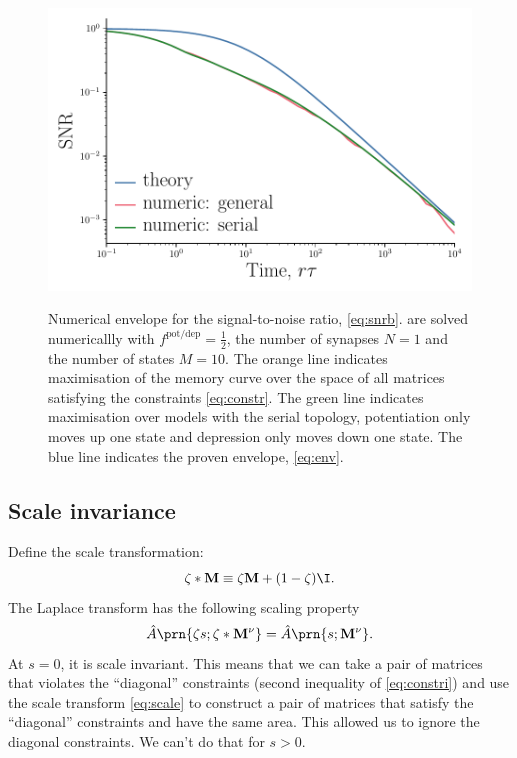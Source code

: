 \documentclass[12pt]{article}
\newcommand{\M}{\mathbf{M}}
\newcommand{\potdep}{^{\text{pot/dep}}}
\begin{document}
\begin{figure}[tb]
  \centering
  \includegraphics[width=0.8\linewidth]{LenvNum.pdf}\\
  \caption[Numerical envelope for the signal-to-noise ratio]
  {Numerical envelope for the signal-to-noise ratio, \eqref{eq:snrb}. 
   are solved numericallly with $f\potdep=\frac{1}{2}$, the number of synapses $N=1$ and the number of states $M=10$.
  The orange line indicates maximisation of the memory curve over the space of all matrices satisfying the constraints \eqref{eq:constr}.
  The green line indicates maximisation over models with the serial topology, \ie potentiation only moves up one state and depression only moves down one state.
  The blue line indicates the proven envelope, \eqref{eq:env}.}\label{fig:envnum}
\end{figure}



\subsection{Scale invariance}\label{sec:scale}

Define the scale transformation:
%
\begin{equation}\label{eq:scale}
  \zeta * \M \equiv \zeta \M + (1-\zeta)\I .
\end{equation}
%
The Laplace transform has the following scaling property
%
\begin{equation}\label{eq:laplacescale}
  \hat{A} \prn{\zeta s;\zeta * \M^\nu} = \hat{A} \prn{s; \M^\nu}.
\end{equation}
%
At $s = 0$, it is scale invariant.
This means that we can take a pair of matrices that violates the ``diagonal'' constraints (second inequality of \eqref{eq:constri}) and use the scale transform \eqref{eq:scale} to construct a pair of matrices that satisfy the ``diagonal'' constraints and have the same area.
This allowed us to ignore the diagonal constraints.
We can't do that for $s > 0$.
\end{document}
